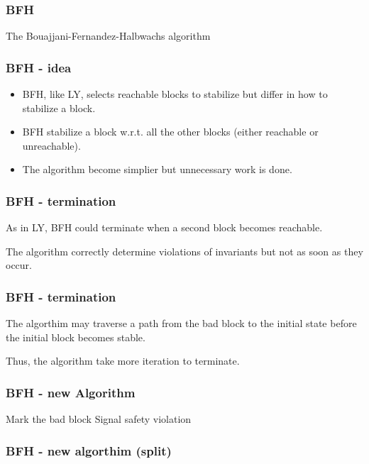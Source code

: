 \documentclass[11pt,handout]{beamer}
\begin{document}
\begin{frame}
  \frametitle{BFH}
  The Bouajjani-Fernandez-Halbwachs algorithm
\end{frame}

\begin{frame}
  \frametitle{BFH - idea}
  \begin{itemize}
  \item BFH, like LY, selects reachable blocks to stabilize but differ in how to
    stabilize a block.
  \item BFH stabilize a block w.r.t. all the other blocks (either reachable or
    unreachable).
  \item The algorithm become simplier but unnecessary work is done.
  \end{itemize} 
\end{frame}

\begin{frame}
  \frametitle{BFH - termination}
  As in LY, BFH could terminate when a second block becomes reachable.
  
  The algorithm correctly determine violations of invariants but not as soon as
  they occur.
\end{frame}

\begin{frame}
  \frametitle{BFH - termination}
  The algorthim may traverse a path from the bad block to the initial state
  before the initial block becomes stable.

  Thus, the algorithm take more iteration to terminate.
\end{frame}

\begin{frame}[fragile]
  \frametitle{BFH - new Algorithm}
  \begin{algorithmic}[1]
    \State Mark the bad block
    \Else
    \EndIf
    \EndWhile
    \State Signal safety violation
    \EndIf
  \end{algorithmic}
\end{frame}

\begin{frame}[fragile]
  \frametitle{BFH - new algorthim (split)}
  \begin{algorithmic}[1]
    \Else
    \EndIf
    \EndFor
    \EndFor
    \EndFunction
  \end{algorithmic}
\end{frame}
\end{document}
